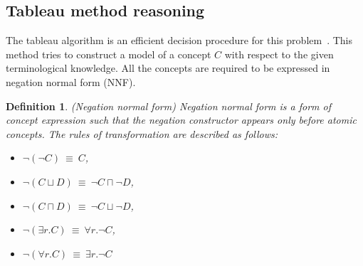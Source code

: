 \documentclass{article}
\newtheorem{mydef}{Definition}
\begin{document}
\subsection{Tableau method reasoning}\label{sec:reasoning}
The tableau algorithm is an efficient decision procedure for this problem~\cite{baader2001overview,nguyen2009efficient,gore2007exptime}.
This method tries to construct a model of a concept $C$ with respect to the given terminological knowledge. 
All the concepts are required to be expressed in negation normal form (NNF). 
\begin{mydef}(Negation normal form)
Negation normal form is a form of concept expression such that the negation constructor appears only before atomic concepts.
The rules of transformation are described as follows:
\begin{itemize}
\item  $\neg(\neg C) ~\equiv~ C$,
\item $\neg(C\sqcup D) ~\equiv~ \neg C \sqcap \neg D$,
\item $\neg(C\sqcap D) ~\equiv~ \neg C \sqcup \neg D$,
\item $\neg(\exists r.C) ~\equiv~ \forall r.\neg C$,
\item $\neg(\forall r.C) ~\equiv~  \exists r.\neg C$
\end{itemize}
\end{mydef}
% 
\end{document}
